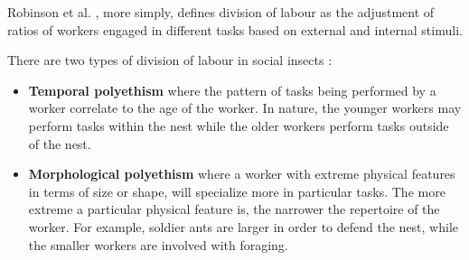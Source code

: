 Robinson et al. \cite{robinson1992regulation}, more simply, defines division of labour as the adjustment of ratios of workers engaged in different tasks based on external and internal stimuli.

There are two types of division of labour in social insects \cite{beshers2001models}: 
\begin{itemize}
	\item \textbf{Temporal polyethism} where the pattern of tasks being performed by a worker correlate to the age of the worker. In nature, the younger workers may perform tasks within the nest while the older workers perform tasks outside of the nest.
	\item \textbf{Morphological polyethism} where a worker with extreme physical features in terms of size or shape, will specialize more in particular tasks. The more extreme a particular physical feature is, the narrower the repertoire of the worker. For example, soldier ants are larger in order to defend the nest, while the smaller workers are involved with foraging.
\end{itemize}




